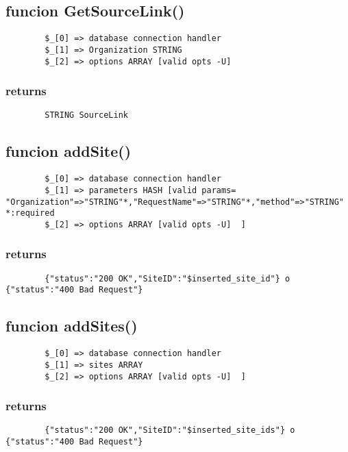\documentclass{article}
\begin{document}
\subsection*{funcion GetSourceLink()\label{funcion_GetSourceLink_}}
\begin{verbatim}
        $_[0] => database connection handler
        $_[1] => Organization STRING
        $_[2] => options ARRAY [valid opts -U]
\end{verbatim}
\subsubsection*{returns\label{returns}}
\begin{verbatim}
        STRING SourceLink
\end{verbatim}
\subsection*{funcion addSite()\label{funcion_addSite_}}
\begin{verbatim}
        $_[0] => database connection handler
        $_[1] => parameters HASH [valid params=  "Organization"=>"STRING"*,"RequestName"=>"STRING"*,"method"=>"STRING"       *:required
        $_[2] => options ARRAY [valid opts -U]  ]
\end{verbatim}
\subsubsection*{returns\label{returns}}
\begin{verbatim}
        {"status":"200 OK","SiteID":"$inserted_site_id"} o {"status":"400 Bad Request"}
\end{verbatim}
\subsection*{funcion addSites()\label{funcion_addSites_}}
\begin{verbatim}
        $_[0] => database connection handler
        $_[1] => sites ARRAY  
        $_[2] => options ARRAY [valid opts -U]  ]
\end{verbatim}
\subsubsection*{returns\label{returns}}
\begin{verbatim}
        {"status":"200 OK","SiteID":"$inserted_site_ids"} o {"status":"400 Bad Request"}
\end{verbatim}
\end{document}
